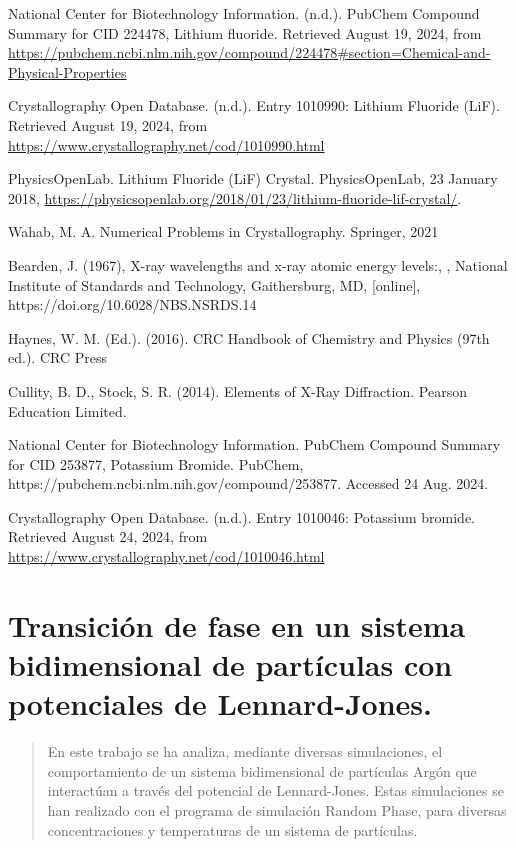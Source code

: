 \begin{thebibliography}{99}


National Center for Biotechnology Information. (n.d.). PubChem Compound Summary for CID 224478, Lithium fluoride. Retrieved August 19, 2024, from \url{https://pubchem.ncbi.nlm.nih.gov/compound/224478#section=Chemical-and-Physical-Properties}


Crystallography Open Database. (n.d.). Entry 1010990: Lithium Fluoride (LiF). Retrieved August 19, 2024, from \url{https://www.crystallography.net/cod/1010990.html} 


PhysicsOpenLab. Lithium Fluoride (LiF) Crystal. PhysicsOpenLab, 23 January 2018, \url{https://physicsopenlab.org/2018/01/23/lithium-fluoride-lif-crystal/}.

Wahab, M. A. Numerical Problems in Crystallography. Springer, 2021

Bearden, J. (1967), X-ray wavelengths and x-ray atomic energy levels:, , National Institute of Standards and Technology, Gaithersburg, MD, [online], https://doi.org/10.6028/NBS.NSRDS.14

Haynes, W. M. (Ed.). (2016). CRC Handbook of Chemistry and Physics (97th ed.). CRC Press


Cullity, B. D., Stock, S. R. (2014). Elements of X-Ray Diffraction. Pearson Education Limited.

National Center for Biotechnology Information. PubChem Compound Summary for CID 253877, Potassium Bromide. PubChem, https://pubchem.ncbi.nlm.nih.gov/compound/253877. Accessed 24 Aug. 2024.

Crystallography Open Database. (n.d.). Entry 1010046: Potassium bromide. Retrieved August 24, 2024, from \url{https://www.crystallography.net/cod/1010046.html}

\end{thebibliography}	


\clearpage


\titleformat{\chapter}[display]
{\normalfont\bfseries}{}{0pt}{\LARGE}
\chapter{Transición de fase en un sistema bidimensional de partículas con potenciales de Lennard-Jones.}
\begin{abstract}
	En este trabajo se ha analiza, mediante diversas simulaciones, el comportamiento de un sistema bidimensional de partículas Argón que interactúan a través del potencial de Lennard-Jones. Estas simulaciones se han realizado con  el programa de simulación Random Phase, para  diversas concentraciones y temperaturas de un sistema de partículas.
\end{abstract}






